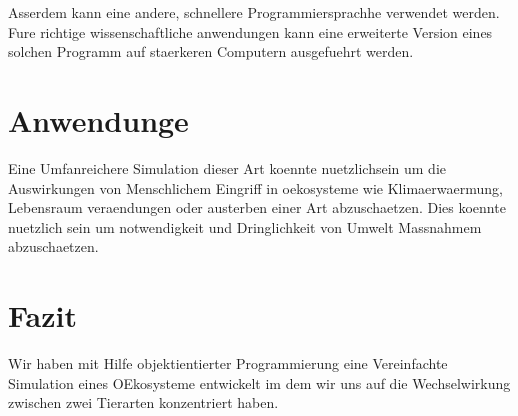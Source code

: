 \documentclass[12pt]{article}
\begin{document}
Asserdem kann eine andere, schnellere Programmiersprachhe verwendet werden.
Fure richtige wissenschaftliche anwendungen kann eine erweiterte Version eines solchen Programm auf staerkeren Computern ausgefuehrt werden.
\section{Anwendunge}
Eine Umfanreichere Simulation dieser Art koennte nuetzlichsein um die Auswirkungen von Menschlichem Eingriff in oekosysteme wie Klimaerwaermung, Lebensraum veraendungen oder austerben einer Art abzuschaetzen.
Dies koennte nuetzlich sein um notwendigkeit und Dringlichkeit von Umwelt Massnahmem abzuschaetzen.
\section{Fazit}
Wir haben mit Hilfe objektientierter Programmierung eine Vereinfachte Simulation eines OEkosysteme entwickelt im dem wir uns auf die Wechselwirkung zwischen zwei Tierarten konzentriert haben.
\end{document}
